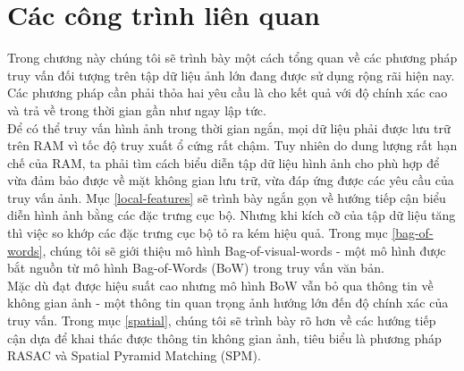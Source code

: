 \chapter{Các công trình liên quan}
\ifpdf
    \graphicspath{{Chapter2/Chapter2Figs/PNG/}{Chapter2/Chapter2Figs/PDF/}{Chapter2/Chapter2Figs/}}
\else
    \graphicspath{{Chapter2/Chapter2Figs/EPS/}{Chapter2/Chapter2Figs/}}
\fi

Trong chương này chúng tôi sẽ trình bày một cách tổng quan về các phương pháp truy vấn đối tượng trên tập dữ liệu ảnh lớn đang được sử dụng rộng rãi hiện nay. Các phương pháp cần phải thỏa hai yêu cầu là cho kết quả với độ chính xác cao và trả về trong thời gian gần như ngay lập tức.\\
Để có thể truy vấn hình ảnh trong thời gian ngắn, mọi dữ liệu phải được lưu trữ trên RAM vì tốc độ truy xuất ổ cứng rất chậm. Tuy nhiên do dung lượng rất hạn chế của RAM, ta phải tìm cách biểu diễn tập dữ liệu hình ảnh cho phù hợp để vừa đảm bảo được về mặt không gian lưu trữ, vừa đáp ứng được các yêu cầu của truy vấn ảnh. Mục \ref{local-features} sẽ trình bày ngắn gọn về hướng tiếp cận biểu diễn hình ảnh bằng các đặc trưng cục bộ. Nhưng khi kích cỡ của tập dữ liệu tăng thì việc so khớp các đặc trưng cục bộ tỏ ra kém hiệu quả. Trong mục \ref{bag-of-words}, chúng tôi sẽ giới thiệu mô hình Bag-of-visual-words - một mô hình được bắt nguồn từ mô hình Bag-of-Words (BoW) trong truy vấn văn bản.\\
Mặc dù đạt được hiệu suất cao nhưng mô hình BoW vẫn bỏ qua thông tin về không gian ảnh - một thông tin quan trọng ảnh hướng lớn đến độ chính xác của truy vấn. Trong mục \ref{spatial}, chúng tôi sẽ trình bày rõ hơn về các hướng tiếp cận dựa để khai thác được thông tin không gian ảnh, tiêu biểu là phương pháp RASAC và Spatial Pyramid Matching (SPM).


